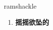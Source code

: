 
\begin{frame}
{\huge ramshackle}
\begin{center}
\begin{enumerate}\Large
  \item \textbf{摇摇欲坠的}
\end{enumerate}
\end{center}
\end{frame}
